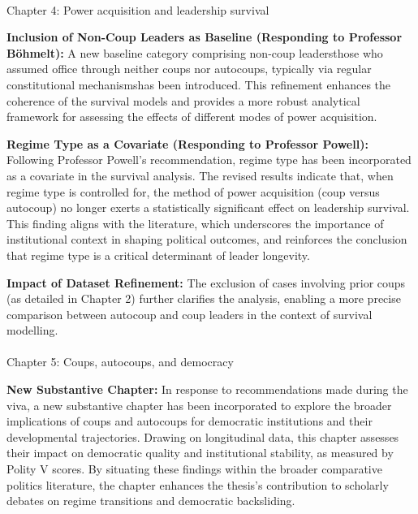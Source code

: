 \documentclass[
  12pt,
  letterpaper,
  DIV=11,
  numbers=noendperiod]{scrartcl}
\makeatletter
\let\oldparagraph\paragraph
\renewcommand{\paragraph}{
    \@ifstar
      \xxxParagraphStar
      \xxxParagraphNoStar
  }
\newcommand{\xxxParagraphStar}[1]{\oldparagraph*{#1}\mbox{}}
\newcommand{\xxxParagraphNoStar}[1]{\oldparagraph{#1}\mbox{}}
\makeatother
\begin{document}
\paragraph{Chapter 4: Power acquisition and leadership
survival}\label{chapter-4-power-acquisition-and-leadership-survival}

\textbf{Inclusion of Non-Coup Leaders as Baseline (Responding to
Professor Böhmelt):} A new baseline category comprising non-coup
leadersthose who assumed office through neither coups nor autocoups,
typically via regular constitutional mechanismshas been introduced. This
refinement enhances the coherence of the survival models and provides a
more robust analytical framework for assessing the effects of different
modes of power acquisition.

\textbf{Regime Type as a Covariate (Responding to Professor Powell):}
Following Professor Powell's recommendation, regime type has been
incorporated as a covariate in the survival analysis. The revised
results indicate that, when regime type is controlled for, the method of
power acquisition (coup versus autocoup) no longer exerts a
statistically significant effect on leadership survival. This finding
aligns with the literature, which underscores the importance of
institutional context in shaping political outcomes, and reinforces the
conclusion that regime type is a critical determinant of leader
longevity.

\textbf{Impact of Dataset Refinement:} The exclusion of cases involving
prior coups (as detailed in Chapter 2) further clarifies the analysis,
enabling a more precise comparison between autocoup and coup leaders in
the context of survival modelling.

\paragraph{Chapter 5: Coups, autocoups, and
democracy}\label{chapter-5-coups-autocoups-and-democracy}

\textbf{New Substantive Chapter:} In response to recommendations made
during the viva, a new substantive chapter has been incorporated to
explore the broader implications of coups and autocoups for democratic
institutions and their developmental trajectories. Drawing on
longitudinal data, this chapter assesses their impact on democratic
quality and institutional stability, as measured by Polity V scores. By
situating these findings within the broader comparative politics
literature, the chapter enhances the thesis's contribution to scholarly
debates on regime transitions and democratic backsliding.
\end{document}
